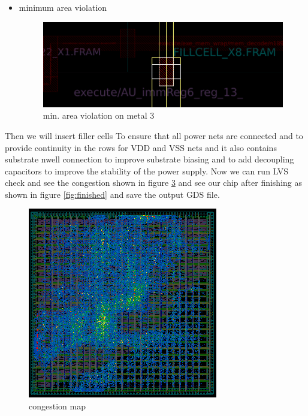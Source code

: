 \documentclass[../main.tex]{subfiles}
\begin{document}
\begin{itemize}
\begin{figure}[h!]
        \caption{min. enclosed area violation on metal 3}
        \label{fig:min_area_enclosed}
    \end{figure}
    \item minimum area violation
    \begin{figure}[h!]
        \centering
        \includegraphics[width=10 cm]{diagrams/min_area.png}
        \caption{min. area violation on metal 3}
        \label{fig:min_area}
    \end{figure}
\end{itemize}
Then we will insert filler cells To ensure that all power nets are connected and to provide continuity in the rows for VDD and VSS nets and it also contains substrate nwell connection to improve substrate biasing and to add decoupling capacitors to improve the stability of the power supply.
Now we can run LVS check and see the congestion shown in figure \ref{fig:congestion_finished} and see our chip after finishing as shown in figure \ref{fig:finished} and save the output GDS file.

\begin{figure}[h!]
    \centering
    \includegraphics[width=10 cm]{diagrams/congestion_after_finishing.png}
    \caption{congestion map}
    \label{fig:congestion_finished}
\end{figure}
\end{document}
